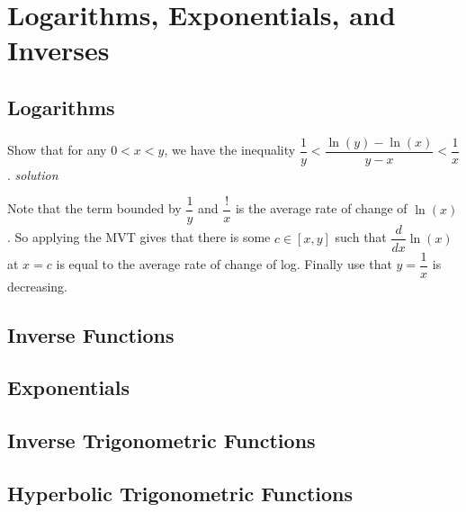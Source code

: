 \chapter{Logarithms, Exponentials, and Inverses}

\section{Logarithms}
\begin{Exercise}[title={A Nice Bound for Log}, difficulty=2, label=7a1]
Show that for any $0<x<y$, we have the inequality $\dfrac{1}{y} < \dfrac{\ln(y)-\ln(x)}{y-x}< \dfrac{1}{x}$. \hfill \emph{solution} 

\end{Exercise}

\begin{Answer}[ref={7a1}]
	Note that the term bounded by $\dfrac{1}{y}$ and $\dfrac{!}{x}$ is the average rate of change of $\ln(x)$. So applying the MVT gives that there is some $c\in [x,y]$ such that $\dfrac{d}{dx} \ln(x)$ at $x=c$ is equal to the average rate of change of log. Finally use that $y=\dfrac{1}{x}$ is decreasing.
	
\end{Answer}

\begin{Exercise}[title={$x^y$ vs $y^x$}, difficulty=2, label=7a2]

\hfill \emph{solution} (7a2}
\end{Exercise}

\begin{Answer}[ref={7a2}]

\end{Answer}

\section{Inverse Functions}

\section{Exponentials}

\section{Inverse Trigonometric Functions}

\section{Hyperbolic Trigonometric Functions}

